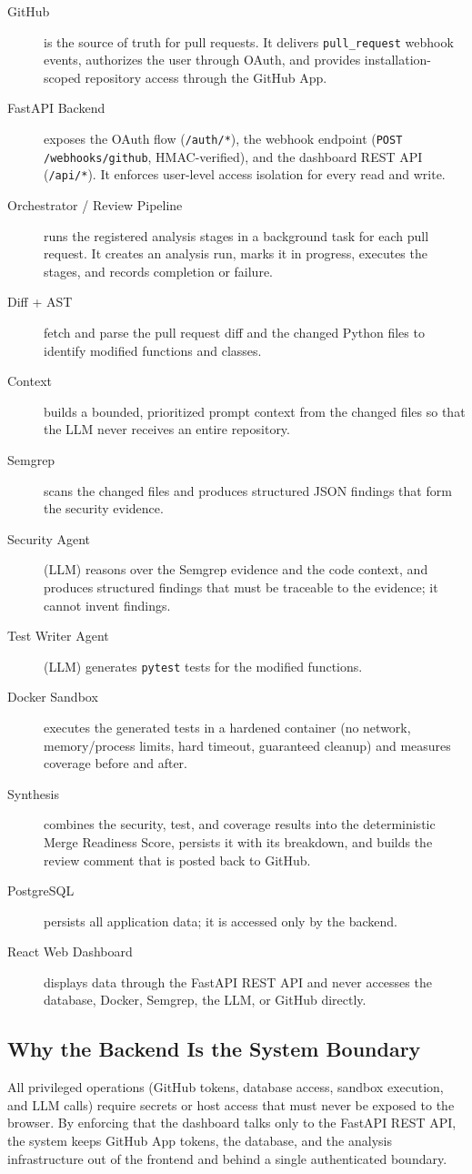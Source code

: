 \begin{description}
  \item[GitHub] is the source of truth for pull requests. It delivers
  \texttt{pull\_request} webhook events, authorizes the user through OAuth,
  and provides installation-scoped repository access through the GitHub App.
  \item[FastAPI Backend] exposes the OAuth flow (\texttt{/auth/*}), the
  webhook endpoint (\texttt{POST /webhooks/github}, HMAC-verified), and the
  dashboard REST API (\texttt{/api/*}). It enforces user-level access
  isolation for every read and write.
  \item[Orchestrator / Review Pipeline] runs the registered analysis stages in
  a background task for each pull request. It creates an analysis run, marks
  it in progress, executes the stages, and records completion or failure.
  \item[Diff + AST] fetch and parse the pull request diff and the changed
  Python files to identify modified functions and classes.
  \item[Context] builds a bounded, prioritized prompt context from the changed
  files so that the LLM never receives an entire repository.
  \item[Semgrep] scans the changed files and produces structured JSON findings
  that form the security evidence.
  \item[Security Agent] (LLM) reasons over the Semgrep evidence and the code
  context, and produces structured findings that must be traceable to the
  evidence; it cannot invent findings.
  \item[Test Writer Agent] (LLM) generates \texttt{pytest} tests for the
  modified functions.
  \item[Docker Sandbox] executes the generated tests in a hardened container
  (no network, memory/process limits, hard timeout, guaranteed cleanup) and
  measures coverage before and after.
  \item[Synthesis] combines the security, test, and coverage results into the
  deterministic Merge Readiness Score, persists it with its breakdown, and
  builds the review comment that is posted back to GitHub.
  \item[PostgreSQL] persists all application data; it is accessed only by the
  backend.
  \item[React Web Dashboard] displays data through the FastAPI REST API and
  never accesses the database, Docker, Semgrep, the LLM, or GitHub directly.
\end{description}

\subsection{Why the Backend Is the System Boundary}

All privileged operations (GitHub tokens, database access, sandbox
execution, and LLM calls) require secrets or host access that must never be
exposed to the browser. By enforcing that the dashboard talks only to the
FastAPI REST API, the system keeps GitHub App tokens, the database, and the
analysis infrastructure out of the frontend and behind a single
authenticated boundary.